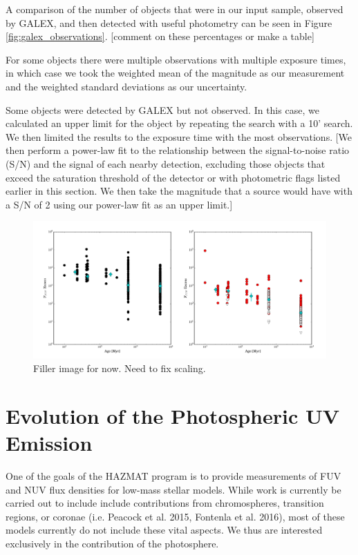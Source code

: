 \documentclass[twocolumn]{aastex62}
\begin{document}
A comparison of the number of objects that were in our input sample, observed by GALEX, and then detected with useful photometry can be seen in Figure \ref{fig:galex_observations}. [comment on these percentages or make a table]

For some objects there were multiple observations with multiple exposure times, in which case we took the weighted mean of the magnitude as our measurement and the weighted standard deviations as our uncertainty.

Some objects were detected by GALEX but not observed. In this case, we calculated an upper limit for the object by repeating the search with a 10' search. We then limited the results to the exposure time with the most observations. [We then perform a power-law fit to the relationship between the signal-to-noise ratio (S/N) and the signal of each nearby detection, excluding those objects that exceed the saturation threshold of the detector or with photometric flags listed earlier in this section. We then take the magnitude that a source would have with a S/N of 2 using our power-law fit as an upper limit.]

\begin{figure}[t]
\centering
\includegraphics[width=\linewidth]{ffdensity_age_NO_J.pdf}
\caption{Filler image for now. Need to fix scaling. \label{fig:ffdensity_age}}
\end{figure}


\section{Evolution of the Photospheric UV Emission}

One of the goals of the HAZMAT program is to provide measurements of FUV and NUV flux densities for low-mass stellar models. While work is currently be carried out to include include contributions from chromospheres, transition regions, or coronae (i.e. Peacock et al. 2015, Fontenla et al. 2016), most of these models currently do not include these vital aspects. We thus are interested exclusively in the contribution of the photosphere. 
\end{document}
